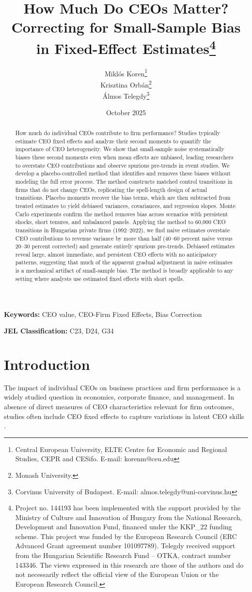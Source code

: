 \documentclass[11pt,a4paper]{article}
\title{How Much Do CEOs Matter? Correcting for Small-Sample Bias in Fixed-Effect Estimates\thanks{Project no. 144193 has been implemented with the support provided by the Ministry of Culture and Innovation of Hungary from the National Research, Development and Innovation Fund, financed under the KKP\_22 funding scheme. This project was funded by the European Research Council (ERC Advanced Grant agreement number 101097789). Telegdy received support from the Hungarian Scientific Research Fund – OTKA, contract number 143346. The views expressed in this research are those of the authors and do not necessarily reflect the official view of the European Union or the European Research Council.}}
\author{Miklós Koren\thanks{Central European University, ELTE Centre for Economic and Regional Studies, CEPR and CESifo. E-mail: korenm@ceu.edu} \\
        Krisztina Orbán\thanks{Monash University.} \\
        Álmos Telegdy\thanks{Corvinus University of Budapest. E-mail: almos.telegdy@uni-corvinus.hu}}
\date{October 2025}
\begin{document}
\maketitle
\thispagestyle{empty}

\begin{abstract}
How much do individual CEOs contribute to firm performance? Studies typically estimate CEO fixed effects and analyze their second moments to quantify the importance of CEO heterogeneity. We show that small-sample noise systematically biases these second moments even when mean effects are unbiased, leading researchers to overstate CEO contributions and observe spurious pre-trends in event studies. We develop a placebo-controlled method that identifies and removes these biases without modeling the full error process. The method constructs matched control transitions in firms that do not change CEOs, replicating the spell-length design of actual transitions. Placebo moments recover the bias terms, which are then subtracted from treated estimates to yield debiased variances, covariances, and regression slopes. Monte Carlo experiments confirm the method removes bias across scenarios with persistent shocks, short tenures, and unbalanced panels. Applying the method to 60,000 CEO transitions in Hungarian private firms (1992--2022), we find naive estimates overstate CEO contributions to revenue variance by more than half (40--60 percent naive versus 20--30 percent corrected) and generate entirely spurious pre-trends. Debiased estimates reveal large, almost immediate, and persistent CEO effects with no anticipatory patterns, suggesting that much of the apparent gradual adjustment in naive estimates is a mechanical artifact of small-sample bias. The method is broadly applicable to any setting where analysts use estimated fixed effects with short spells.
\end{abstract}

\textbf{Keywords:} CEO value, CEO-Firm Fixed Effects, Bias Correction

\textbf{JEL Classification:} C23, D24, G34

\clearpage
\setcounter{page}{1}

\section{Introduction}

The impact of individual CEOs on business practices and firm performance is a widely studied question in economics, corporate finance, and management. In absence of direct measures of CEO characteristics relevant for firm outcomes, studies often include CEO fixed effects to capture variations in latent CEO skills \citep{Bertrand2003-io, crossland2011differences, quigley2015has}. 
\end{document}
